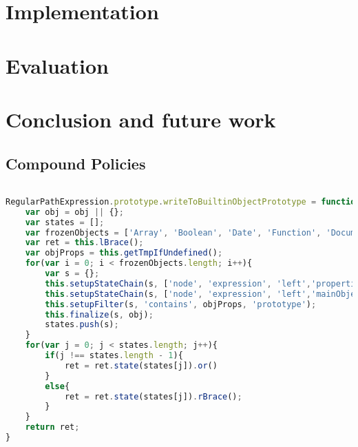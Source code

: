 \documentclass[a4paper, 12pt]{report}
\begin{document}
\chapter{Implementation}
\label{ch:Implementation}

 
\chapter{Evaluation}

 
\chapter{Conclusion and future work}


\begin{appendices}
\chapter{Compound Policies}

\begin{lstlisting}[label={lst:WriteToBuiltinObjectPrototype},language=JavaScript,caption=The \texttt{writeToBuiltinObjectPrototype} predicate,mathescape=true]  % float=t?

RegularPathExpression.prototype.writeToBuiltinObjectPrototype = function(obj){
	var obj = obj || {};
	var states = [];
	var frozenObjects = ['Array', 'Boolean', 'Date', 'Function', 'Document', 'Math', 'Window','String'];
	var ret = this.lBrace();
	var objProps = this.getTmpIfUndefined();
	for(var i = 0; i < frozenObjects.length; i++){
		var s = {};
		this.setupStateChain(s, ['node', 'expression', 'left','properties'], objProps);
		this.setupStateChain(s, ['node', 'expression', 'left','mainObjectName'], frozenObjects[i]);
		this.setupFilter(s, 'contains', objProps, 'prototype');
		this.finalize(s, obj);
		states.push(s);
	}
	for(var j = 0; j < states.length; j++){
		if(j !== states.length - 1){
			ret = ret.state(states[j]).or()
		}
		else{
			ret = ret.state(states[j]).rBrace();
		}
	}
	return ret;
}
\end{lstlisting}

\end{appendices}

\printbibliography
\end{document}
